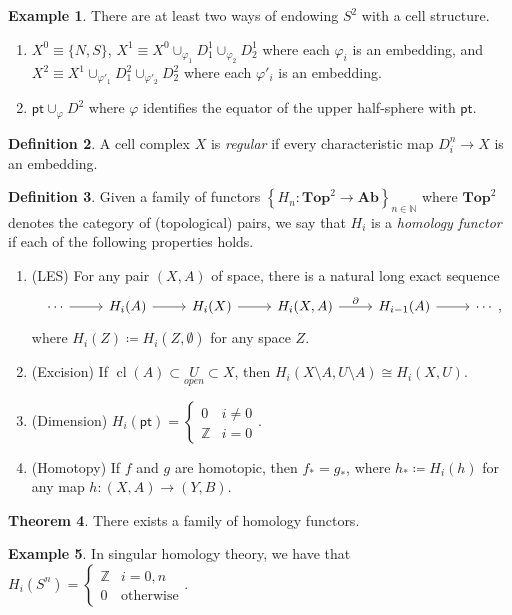\documentclass[10pt,letterpaper,cm]{nupset}
\theoremstyle{definition}
\newtheorem{defn}{Definition}[subsection]
\newtheorem{exmp}[defn]{Example}
\theoremstyle{theorem}
\newtheorem{theorem}[defn]{Theorem}
\theoremstyle{remark}
\newcommand{\N}{\mathbb N}
\newcommand{\Z}{\mathbb Z}
\newcommand{\1}{\mathbb{1}}
\newcommand{\0}{\vec 0}
\newcommand{\pt}{\mathsf{pt}}
\DeclareMathOperator{\cl}{cl}
\newcommand{\be}{\begin{enumerate}}
\newcommand{\ee}{\end{enumerate}}
\begin{document}
\begin{exmp} There are at least two ways of endowing $S^2$ with a cell structure.
\be
\item $X^0 \equiv \{N, S\}$, $X^1 \equiv X^0 \cup_{\varphi_1} D_1^1 \cup_{\varphi_2} D_2^1$ where each $\varphi_i$ is an embedding, and $X^2 \equiv X^1  \cup_{\varphi'_1} D_1^2 \cup_{\varphi'_2} D_2^2$ where each $\varphi'_i$ is an embedding. 
\item $\pt \cup_{\varphi} D^2$ where $\varphi$ identifies the equator of the upper half-sphere with $\pt$.
\ee
\end{exmp}

\begin{defn}
A cell complex $X$ is \textit{regular} if every characteristic map $D_i^n \to X$ is an embedding. 
\end{defn}

\begin{defn}
Given a family of functors $\left\{H_n : \mathbf{Top}^2 \to \mathbf{Ab}\right\}_{n\in \N}$ where $\mathbf{Top}^2$ denotes the category of (topological) pairs, we say that $H_i$ is a \textit{homology functor} if  each of the following properties holds.
\be
\item (LES) For any pair $\left(X, A\right)$ of space, there is a natural long exact sequence
\[
\begin{tikzcd}
\cdots \arrow[r] & H_i(A)  \arrow[r] & H_i(X) \arrow[r] & {H_i(X, A)} \arrow[r, "\partial"] & H_{i-1}(A) \arrow[r] & \cdots
\end{tikzcd},
\] where $H_i(Z) \coloneqq H_i(Z, \emptyset)$ for any space $Z$.
\item (Excision) If $\cl(A) \subset \underset{open}{U} \subset X$, then $H_i(X\setminus A, U \setminus A) \cong H_i(X, U)$.
\item (Dimension) $H_i(\pt) = \begin{cases} 0 & i \ne 0 \\ \Z & i =0 \end{cases}$.
\item (Homotopy) If $f$ and $g$ are homotopic, then $f_{\ast} = g_{\ast}$, where $h_{\ast} \coloneqq H_i(h)$ for any map $h: (X,A) \to (Y, B)$. 
\ee
\end{defn}

\begin{theorem}
There exists a family of homology functors.
\end{theorem}

\begin{exmp}
In singular homology theory, we have that $H_i(S^n) = \begin{cases} \Z & i = 0, n \\ 0 & \text{otherwise} \end{cases}.$ 
\end{exmp}
\end{document}
